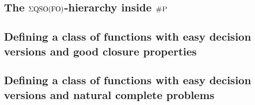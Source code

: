 
\subsection{The $\Sigma{\rm QSO}({\rm FO})$-hierarchy inside $\text{\sc \#P}$}
\label{sec-hier-shp}


\subsection{Defining a class of functions with easy decision versions and good closure properties}
\label{sec-clo}


\subsection{Defining a class of functions with easy decision versions and natural complete problems}
\label{sec-horn}



